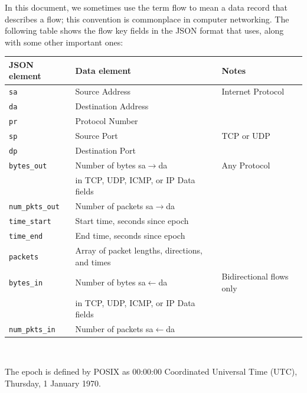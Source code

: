 \documentclass{book}
\begin{document}
In this document, we sometimes use the term flow
to mean a data record that describes a flow; this convention is
commonplace in computer networking.
The following table shows the flow key fields in the JSON format that  uses,
along with some other important ones:\\
\begin{center}
\begin{tabular}{l|l|l}
JSON element             & Data element                           & Notes            \\ \hline
\texttt{sa}              & Source Address                         & Internet Protocol   \\
\texttt{da}              & Destination Address                    &                     \\
\texttt{pr}              & Protocol Number                        &                     \\ \hline
\texttt{sp}              & Source Port                            & TCP or UDP          \\
\texttt{dp}              & Destination Port                       &                     \\ \hline
\texttt{bytes\_out}      & Number of bytes sa$\rightarrow$da      & Any Protocol        \\ 
                         & in TCP, UDP, ICMP, or IP Data fields   &                    \\ 
\texttt{num\_pkts\_out}  & Number of packets sa$\rightarrow$da    &                     \\ 
\texttt{time\_start}     & Start time, seconds since epoch        &                     \\
\texttt{time\_end}       & End time, seconds since epoch          &                     \\ 
\texttt{packets}         & Array of packet lengths, directions, and times &                \\ \hline \rowcolor{lightgray}
\texttt{bytes\_in}      & Number of bytes sa$\leftarrow$da       & Bidirectional flows only  \\ \rowcolor{lightgray}
                         & in TCP, UDP, ICMP, or IP Data fields   &                    \\ \rowcolor{lightgray}
\texttt{num\_pkts\_in}  & Number of packets sa$\leftarrow$da      &                    
\end{tabular}\\
\end{center}
The epoch is defined by POSIX as 00:00:00 Coordinated Universal Time
(UTC), Thursday, 1 January 1970.
\end{document}
